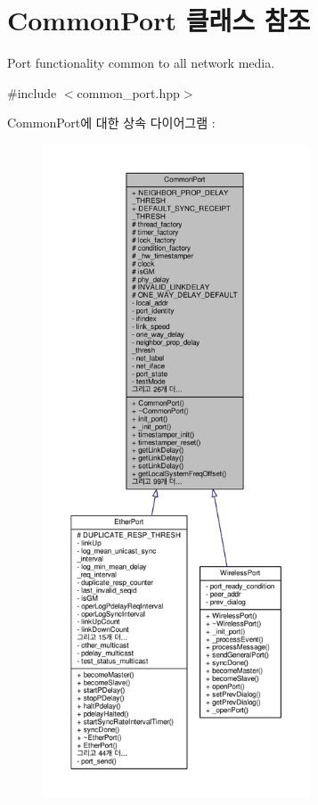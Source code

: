 \hypertarget{class_common_port}{}\section{Common\+Port 클래스 참조}
\label{class_common_port}


Port functionality common to all network media.  




{\ttfamily \#include $<$common\+\_\+port.\+hpp$>$}



Common\+Port에 대한 상속 다이어그램 \+: 
\nopagebreak
\begin{figure}[H]
\begin{center}
\leavevmode
\includegraphics[height=550pt]{class_common_port__inherit__graph}
\end{center}
\end{figure}


